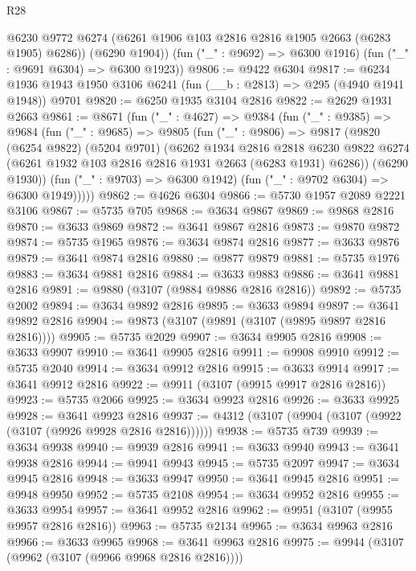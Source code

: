 \begin{lexlean}{R28}
\begin{coremodule}
          @6230
          @9772
          @6274
          (@6261 @1906 @103 @2816 @2816 @1905 @2663 (@6283 @1905) @6286))
        (@6290 @1904))
      (fun ("_" : @9692) => @6300 @1916)
      (fun ("_" : @9691 @6304) => @6300 @1923))
@9806 := @9422 @6304
@9817 := @6234 @1936 @1943 @1950 @3106 @6241 (fun (__b : @2813) => @295 (@4940 @1941 @1948)) @9701
@9820 := @6250 @1935 @3104 @2816
@9822 := @2629 @1931 @2663
@9861 := @8671
    (fun ("_" : @4627) =>
    @9384
      (fun ("_" : @9385) =>
      @9684
        (fun ("_" : @9685) =>
        @9805
          (fun ("_" : @9806) =>
          @9817
            (@9820
              (@6254 @9822)
              (@5204 @9701)
              (@6262
                @1934
                @2816
                @2818
                @6230
                @9822
                @6274
                (@6261 @1932 @103 @2816 @2816 @1931 @2663 (@6283 @1931) @6286))
              (@6290 @1930))
            (fun ("_" : @9703) => @6300 @1942)
            (fun ("_" : @9702 @6304) => @6300 @1949)))))
@9862 := @4626 @6304
@9866 := @5730 @1957 @2089 @2221 @3106
@9867 := @5735 @705
@9868 := @3634 @9867
@9869 := @9868 @2816
@9870 := @3633 @9869
@9872 := @3641 @9867 @2816
@9873 := @9870 @9872
@9874 := @5735 @1965
@9876 := @3634 @9874 @2816
@9877 := @3633 @9876
@9879 := @3641 @9874 @2816
@9880 := @9877 @9879
@9881 := @5735 @1976
@9883 := @3634 @9881 @2816
@9884 := @3633 @9883
@9886 := @3641 @9881 @2816
@9891 := @9880 (@3107 (@9884 @9886 @2816 @2816))
@9892 := @5735 @2002
@9894 := @3634 @9892 @2816
@9895 := @3633 @9894
@9897 := @3641 @9892 @2816
@9904 := @9873 (@3107 (@9891 (@3107 (@9895 @9897 @2816 @2816))))
@9905 := @5735 @2029
@9907 := @3634 @9905 @2816
@9908 := @3633 @9907
@9910 := @3641 @9905 @2816
@9911 := @9908 @9910
@9912 := @5735 @2040
@9914 := @3634 @9912 @2816
@9915 := @3633 @9914
@9917 := @3641 @9912 @2816
@9922 := @9911 (@3107 (@9915 @9917 @2816 @2816))
@9923 := @5735 @2066
@9925 := @3634 @9923 @2816
@9926 := @3633 @9925
@9928 := @3641 @9923 @2816
@9937 := @4312 (@3107 (@9904 (@3107 (@9922 (@3107 (@9926 @9928 @2816 @2816))))))
@9938 := @5735 @739
@9939 := @3634 @9938
@9940 := @9939 @2816
@9941 := @3633 @9940
@9943 := @3641 @9938 @2816
@9944 := @9941 @9943
@9945 := @5735 @2097
@9947 := @3634 @9945 @2816
@9948 := @3633 @9947
@9950 := @3641 @9945 @2816
@9951 := @9948 @9950
@9952 := @5735 @2108
@9954 := @3634 @9952 @2816
@9955 := @3633 @9954
@9957 := @3641 @9952 @2816
@9962 := @9951 (@3107 (@9955 @9957 @2816 @2816))
@9963 := @5735 @2134
@9965 := @3634 @9963 @2816
@9966 := @3633 @9965
@9968 := @3641 @9963 @2816
@9975 := @9944 (@3107 (@9962 (@3107 (@9966 @9968 @2816 @2816))))

\end{coremodule}
\end{lexlean}
